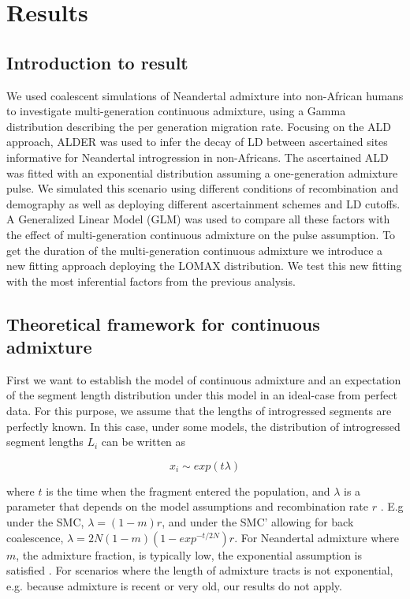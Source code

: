 \documentclass[]{article}
\begin{document}
\section{Results}\label{results}

\subsection{Introduction to result}\label{introduction to result}

We used coalescent simulations of Neandertal admixture into non-African humans to investigate multi-generation continuous admixture, using a Gamma distribution describing the per generation migration rate. Focusing on the ALD approach, ALDER was used to infer the decay of LD between ascertained sites informative for Neandertal introgression in non-Africans. The ascertained ALD was fitted with an exponential distribution assuming a one-generation admixture pulse.  We simulated this scenario using different conditions of recombination and demography as well as deploying different ascertainment schemes and LD cutoffs. A Generalized Linear Model (GLM) was used to compare all these factors with the effect of multi-generation continuous admixture on the pulse assumption. To get the duration of the multi-generation continuous admixture we introduce a new fitting approach deploying the LOMAX distribution. We test this new fitting with the most inferential factors from the previous analysis.

\subsection{Theoretical framework for continuous admixture}\label{theoretical framework for continuous admixture}

First we want to establish the model of continuous admixture and an
expectation of the segment length distribution under this model in an
ideal-case from perfect data. For this purpose, we assume that the
lengths of introgressed segments are perfectly known. In this case, under
some models, the distribution of introgressed segment lengths \(L_i\) can
be written as

\begin{equation}
x_i \sim exp({t \lambda})
\end{equation}

where \(t\) is the time when the fragment entered the population, and
\(\lambda\) is a parameter that depends on the model assumptions and
recombination rate \(r\) \citep{liang_lengths_2014}. E.g under the SMC,
\(\lambda = (1-m)r\), and under the SMC' allowing for back coalescence,
\(\lambda = 2N(1-m)(1-exp^{-t/2N})r\). For Neandertal admixture where
\(m\), the admixture fraction, is typically low, the exponential
assumption is satisfied \cite{liang_lengths_2014}. For scenarios where
the length of admixture tracts is not exponential, e.g. because
admixture is recent or very old, our results do not apply.
\end{document}
